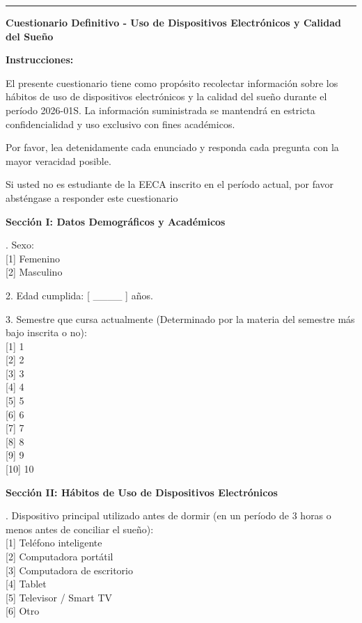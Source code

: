 \documentclass[12pt, letterpaper]{article}
\begin{document}
\begin{singlespace}
\small
\noindent\rule{\textwidth}{0.4pt}\par\smallskip
\textbf{Cuestionario Definitivo - Uso de Dispositivos Electrónicos y Calidad del Sueño}\par\medskip

\textbf{Instrucciones:}\par\noindent
El presente cuestionario tiene como propósito recolectar información sobre los hábitos de uso de dispositivos electrónicos y la calidad del sueño durante el período 2026-01S. La información suministrada se mantendrá en estricta confidencialidad y uso exclusivo con fines académicos.\par\noindent
Por favor, lea detenidamente cada enunciado y responda cada pregunta con la mayor veracidad posible.\par\noindent
Si usted no es estudiante de la EECA inscrito en el período actual, por favor absténgase a responder este cuestionario\par\medskip

\textbf{Sección I: Datos Demográficos y Académicos}\par{}. Sexo:\\
{[1]} Femenino\\
{[2]} Masculino\par\smallskip

2. Edad cumplida: {[ \_\_\_\_ ]} años.\par\smallskip

3. Semestre que cursa actualmente (Determinado por la materia del semestre más bajo inscrita o no):\\
{[1]} 1\textdegree{}\\
{[2]} 2\textdegree{}\\
{[3]} 3\textdegree{}\\
{[4]} 4\textdegree{}\\
{[5]} 5\textdegree{}\\
{[6]} 6\textdegree{}\\
{[7]} 7\textdegree{}\\
{[8]} 8\textdegree{}\\
{[9]} 9\textdegree{}\\
{[10]} 10\textdegree{}\par\medskip

\textbf{Sección II: Hábitos de Uso de Dispositivos Electrónicos}\par{}. Dispositivo principal utilizado antes de dormir (en un período de 3 horas o menos antes de conciliar el sueño):\\
{[1]} Teléfono inteligente\\
{[2]} Computadora portátil\\
{[3]} Computadora de escritorio\\
{[4]} Tablet\\
{[5]} Televisor / Smart TV\\
{[6]} Otro\par\smallskip


\end{singlespace}
\end{document}
